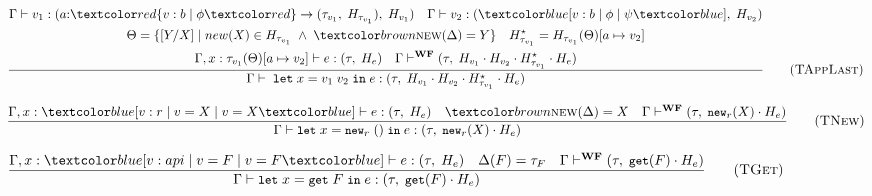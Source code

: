 \begin{figure}[h]
    \begin{equation}
        \frac{
            \begin{gathered}
                \Gamma \vdash v_1: (a{:}\overa{v: b \;|\; \phi} \rightarrow (\tau_{v_1}, \;H_{\tau_{v_1}}), \; H_{v_1}) \quad \Gamma \vdash v_2: (\under{v: b \;|\; \phi \;|\; \psi}, \; H_{v_2}) \\
                \Theta = \{[Y/X] \;|\; new(X) \in H_{\tau_{v_1}} \;\land\; \nextd(\Delta) = Y\} \quad H_{\tau_{v_1}}^{\star} = H_{\tau_{v_1}}(\Theta)[a \mapsto v_2] \\
                \Gamma, x : \tau_{v_1}(\Theta)[a \mapsto v_2] \vdash e: (\tau, \; H_e) \quad \Gamma \vdash^{\textbf{WF}} (\tau, \; H_{v_1} \cdot H_{v_2} \cdot H_{\tau_{v_1}}^{\star} \cdot H_e)
            \end{gathered}
        }{
            \Gamma \vdash \;\texttt{let}\; x = v_1 \; v_2 \;\texttt{in}\; e: (\tau, \; H_{v_1} \cdot H_{v_2} \cdot H_{\tau_{v_1}}^{\star} \cdot H_e)
        }
        \tag{\textsc{TAppLast}}
        \label{eq:tapplast}
    \end{equation}

    \begin{equation}
        \frac{
            \Gamma, x: \under{v: r \;|\; v = X \;|\; v = X} \vdash e : (\tau, \; H_e) \quad \nextd(\Delta) = X \quad \Gamma \vdash^{\textbf{WF}} (\tau, \; \texttt{\small{new}}_r(X) \cdot H_e)
        }{
            \Gamma \vdash \texttt{\small{let}}\;x = \texttt{\small{new}}_r\;()\;\texttt{\small{in}}\;e : (\tau, \;\texttt{\small{new}}_r(X) \cdot H_e)
        }
        \tag{\textsc{TNew}}
        \label{eq:tnew}
    \end{equation}

    \begin{equation}
        \frac{
            \Gamma, x : \under{v: api \;|\; v = F \;|\; v = F} \vdash e : (\tau, \; H_e) \quad \Delta(F) = \tau_{F} \quad \Gamma \vdash^{\textbf{WF}} (\tau, \; \texttt{\small{get}}(F) \cdot H_e)
        }{
            \Gamma \vdash \texttt{\small{let}}\;x = \texttt{\small{get}}\;F\;\texttt{\small{in}}\;e : (\tau, \; \texttt{\small{get}}(F) \cdot H_e)
        }
        \tag{\textsc{TGet}}
        \label{eq:tgetapi}
    \end{equation}


\end{figure}
